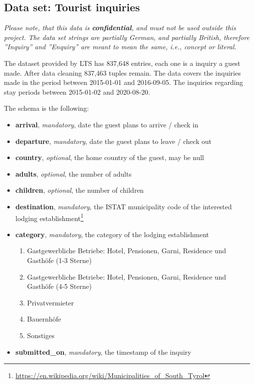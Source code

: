 \subsection{Data set: Tourist inquiries}

\textit{Please note, that this data is \textbf{confidential}, and must not be used outside this project. The data set strings are partially German, and partially British, therefore ''Inquiry'' and ''Enquiry'' are meant to mean the same, i.e., concept or literal.}

The dataset provided by LTS has 837,648 entries, each one is a inquiry
a guest made. After data cleaning 837,463 tuples remain. The data covers the
inquiries made in the period between 2015-01-01 and 2016-09-05. The inquiries
regarding stay periods between 2015-01-02 and 2020-08-20.

The schema is the following:
\begin{itemize}
\item \textbf{arrival}, \textit{mandatory}, date the guest plans to arrive / check in
\item \textbf{departure}, \textit{mandatory}, date the guest plans to leave / check out
\item \textbf{country}, \textit{optional}, the home country of the guest, may be null
\item \textbf{adults}, \textit{optional}, the number of adults
\item \textbf{children}, \textit{optional}, the number of children
\item \textbf{destination}, \textit{mandatory}, the ISTAT municipality code of the interested lodging establishment\footnote{\url{https://en.wikipedia.org/wiki/Municipalities_of_South_Tyrol}}
\item \textbf{category}, \textit{mandatory}, the category of the lodging establishment 
\begin{enumerate}
\item Gastgewerbliche Betriebe: Hotel, Pensionen, Garni, Residence und Gasth\"ofe
(1-3 Sterne)
\item  Gastgewerbliche Betriebe: Hotel, Pensionen, Garni, Residence und Gasth\"ofe (4-5 Sterne) 
\item  Privatvermieter
\item  Bauernh\"ofe
\item Sonstiges
\end{enumerate} 
\item \textbf{submitted\_on}, \textit{mandatory}, the timestamp of the inquiry
\end{itemize}


